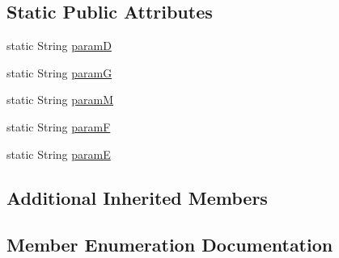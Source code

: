 \subsection*{Static Public Attributes}
\begin{DoxyCompactItemize}
\item 
static String \hyperlink{class_audealizereverb_audio_processor_a5075b2df5f4540e479d2dddc6f5178a9}{paramD}
\item 
static String \hyperlink{class_audealizereverb_audio_processor_a2a3fc9c4b12a08e68aa8457cae9ce3ff}{paramG}
\item 
static String \hyperlink{class_audealizereverb_audio_processor_a3e3ec2690abdac5cbca63fccd0f0d362}{paramM}
\item 
static String \hyperlink{class_audealizereverb_audio_processor_a44f3dca41c6e7237c5c1898b1048c1c4}{paramF}
\item 
static String \hyperlink{class_audealizereverb_audio_processor_a9aba74977dd6a007c7c0bee781204750}{paramE}
\end{DoxyCompactItemize}
\subsection*{Additional Inherited Members}


\subsection{Member Enumeration Documentation}
